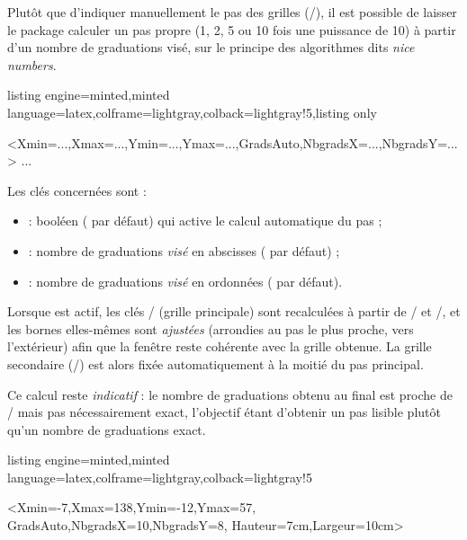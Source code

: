 \documentclass[11pt,a4paper]{ltxdoc}
\begin{document}
Plutôt que d'indiquer manuellement le pas des grilles (/), il est possible de laisser le package calculer un pas \og propre \fg{} (1, 2, 5 ou 10 fois une puissance de 10) à partir d'un nombre de graduations visé, sur le principe des algorithmes dits \textit{nice numbers}.

\begin{tcblisting}{listing engine=minted,minted language=latex,colframe=lightgray,colback=lightgray!5,listing only}
\begin{GraphiqueTikz}%
  [clés globales]%
  <Xmin=...,Xmax=...,Ymin=...,Ymax=...,GradsAuto,NbgradsX=...,NbgradsY=...>
  ...
\end{GraphiqueTikz}
\end{tcblisting}

Les clés concernées sont :

\begin{itemize}
  \item {} : booléen ( par défaut) qui active le calcul automatique du pas ;
  \item {} : nombre de graduations \textit{visé} en abscisses ( par défaut) ;
  \item {} : nombre de graduations \textit{visé} en ordonnées ( par défaut).
\end{itemize}

Lorsque  est actif, les clés / (grille principale) sont recalculées à partir de / et /, et les bornes elles-mêmes sont \textit{ajustées} (arrondies au pas le plus proche, vers l'extérieur) afin que la fenêtre reste cohérente avec la grille obtenue. La grille secondaire (/) est alors fixée automatiquement à la moitié du pas principal.

\smallskip

Ce calcul reste \textit{indicatif} : le nombre de graduations obtenu au final est proche de / mais pas nécessairement exact, l'objectif étant d'obtenir un pas \og lisible \fg{} plutôt qu'un nombre de graduations exact.

\begin{tcblisting}{listing engine=minted,minted language=latex,colframe=lightgray,colback=lightgray!5}
\begin{GraphiqueTikz}%
  <Xmin=-7,Xmax=138,Ymin=-12,Ymax=57,%
  GradsAuto,NbgradsX=10,NbgradsY=8,%
  Hauteur=7cm,Largeur=10cm>
\end{GraphiqueTikz}
\end{tcblisting}
\end{document}
